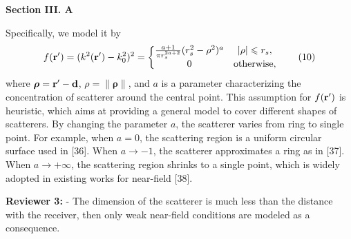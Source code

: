 \documentclass[a4paper,12pt]{article}
\begin{document}
\begin{framed}
	{\bf Section III. A}

    Specifically, we model it by 
	\begin{equation}
		f({\bf r}') = (k^2({\bf r}')-k_0^2)^2  =\left\{\begin{matrix}
		\frac{a+1}{\pi r_s^{2a+2}} (r_s^2-\rho^2)^{a}	&\left| \rho \right|\leqslant r_s, \\ 
		0	& {\rm otherwise},
		\end{matrix}\right.
		\tag{10}
	\end{equation}
where $\boldsymbol{\rho} = {\bf r}' - {\bf d}$, $\rho = \|\boldsymbol{\rho}\|$, and $a$ is a parameter characterizing the concentration of scatterer around the central point. {\color{red} This assumption for $f({\bf r}')$ is heuristic, which aims at providing a general model to cover different shapes of scatterers. By changing the parameter $a$, the scatterer varies from ring to single point.
For example, when $a = 0$, the scattering region is a uniform circular surface used in [36]. When $a \rightarrow -1$, the scatterer approximates a ring as in [37]. When $a \rightarrow +\infty$, the scattering region shrinks to a single point, which is widely adopted in existing works for near-field [38].}
\end{framed}

\textbf{Reviewer 3:}
-   The dimension of the scatterer is much less than the distance with the receiver, then only weak near-field conditions are modeled as a consequence.

{}
\end{document}
